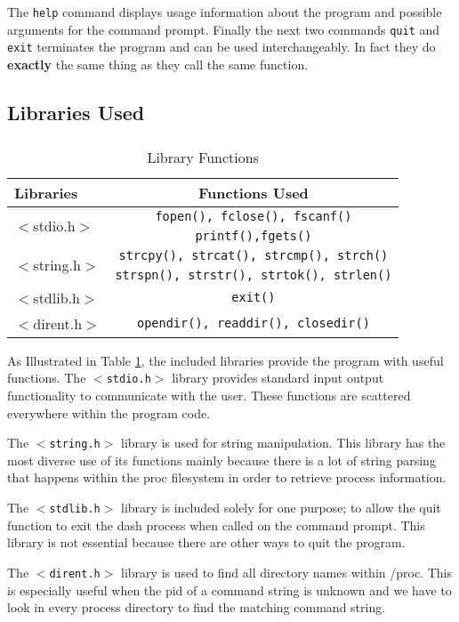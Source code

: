 \documentclass[10pt]{article}
\begin{document}
The \texttt{help} command displays usage information about the program and possible arguments for the command prompt. Finally the next two commands \texttt{quit} and \texttt{exit} terminates the program and can be used interchangeably. In fact they do \textbf{exactly} the same thing as they call the same function.
\newpage

\subsection{Libraries Used}
\subparagraph{}
\begin{table}[t]
\centering
\begin{tabular}{l|c}
	Libraries & Functions Used\\\hline\hline
	\multirow{2}{*}{$<$stdio.h$>$} 
		& \texttt{fopen(), fclose(), fscanf()}\\
	 & \texttt{printf(),fgets()}\\\hline
	\multirow{2}{*}{$<$string.h$>$}
	 & \texttt{strcpy(), strcat(), strcmp(), strch()}\\
		& \texttt{strspn(), strstr(), strtok(), strlen()}\\\hline
	$<$stdlib.h$>$ & \texttt{exit()}\\\hline
	$<$dirent.h$>$ & \texttt{opendir(), readdir(), closedir()}\\
\end{tabular}
\caption{Library Functions}
\label{table:libfuncs}
\end{table}

As Illustrated in Table \ref{table:libfuncs}, the included libraries provide the program with useful functions. The  \texttt{$<$stdio.h$>$} library provides standard input output functionality to communicate with the user. These functions are scattered everywhere within the program code.

The \texttt{$<$string.h$>$} library is used for string manipulation. This library has the most diverse use of its functions mainly because there is a lot of string parsing that happens within the proc filesystem in order to retrieve process information.

The \texttt{$<$stdlib.h$>$} library is included solely for one purpose; to allow the quit function to exit the dash process when called on the command prompt. This library is not essential because there are other ways to quit the program.

The \texttt{$<$dirent.h$>$} library is used to find all directory names within /proc. This is especially useful when the pid of a command string is unknown and we have to look in every process directory to find the matching command string.
\end{document}
